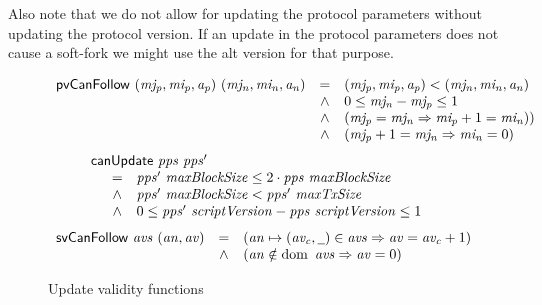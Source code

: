 Also note that we do not allow for updating the protocol parameters without
updating the protocol version. If an update in the protocol parameters does not
cause a soft-fork we might use the alt version for that purpose.

\begin{figure}[htb]
  \begin{equation}
    \label{eq:func:pv-can-follow}
    \begin{array}{r c l}
      \mathsf{pvCanFollow}~(\mathit{mj_p}, \mathit{mi_p}, \mathit{a_p})~(\mathit{mj_n}, \mathit{mi_n}, \mathit{a_n})
      & = & (\mathit{mj_p}, \mathit{mi_p}, \mathit{a_p}) < (\mathit{mj_n}, \mathit{mi_n}, \mathit{a_n})\\
      & \wedge & 0 \leq \mathit{mj_n} - \mathit{mj_p} \leq 1\\
      & \wedge & (\mathit{mj_p} = \mathit{mj_n} \Rightarrow \mathit{mi_p} + 1 = \mathit{mi_n}))\\
      & \wedge & (\mathit{mj_p} + 1 = \mathit{mj_n} \Rightarrow \mathit{mi_n} = 0)
    \end{array}
  \end{equation}
  \nextdef
  \begin{equation}
    \label{eq:func:can-update}
    \begin{array}{l}
      \mathsf{canUpdate}~\mathit{pps}~\mathit{pps'}\\
      {\begin{array}{r c l}
         & = & \mathit{pps'}~\mathit{maxBlockSize} \leq 2\cdot\mathit{pps}~\mathit{maxBlockSize}\\
         & \wedge & \mathit{pps'}~\mathit{maxBlockSize} <  \mathit{pps'}~\mathit{maxTxSize}\\
         & \wedge
             & 0 \leq
               \mathit{pps'}~\mathit{scriptVersion} - \mathit{pps}~\mathit{scriptVersion}
               \leq 1
       \end{array}}
    \end{array}
  \end{equation}
  \nextdef
  \begin{equation}
    \label{eq:func:av-can-follow}
    \begin{array}{r c l}
      \fun{svCanFollow}~\var{avs}~(\var{an}, \var{av}) & =
      & (\var{an} \mapsto (\var{av_c}, \wcard) \in \var{avs}
        \Rightarrow \var{av} = \var{av_c} + 1)\\
      & \wedge & (\var{an} \notin \dom~\var{avs} \Rightarrow \var{av} = 0)
    \end{array}
  \end{equation}
  \caption{Update validity functions}
\end{figure}

